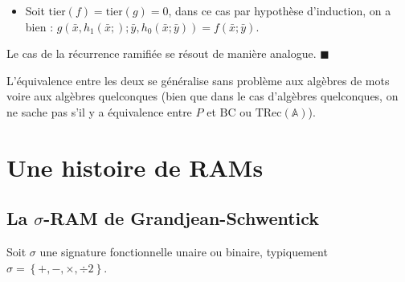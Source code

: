 \documentclass{article}
\newcommand{\TRec}[1]{\text{TRec}\left(\mathbb{#1}\right)}
\begin{document}
\begin{demo}
\begin{itemize}
				\item 	Soit $\text{tier}(f) = \text{tier}(g) = 0$, dans ce cas par hypothèse d'induction, on a bien : $g( \bar{x}, h_1(\bar{x};) ; \bar{y}, h_0(\bar{x}; \bar{y})) = f(\bar{x} ; \bar{y})$.
			\end{itemize}
			
			Le cas de la récurrence ramifiée se résout de manière analogue. $\blacksquare$
		\end{demo}
		

		L'équivalence entre les deux se généralise sans problème aux algèbres de mots voire aux algèbres quelconques (bien que dans le cas d'algèbres quelconques, on ne sache pas s'il y a équivalence entre $P$ et $\text{BC}$ ou $\TRec{A}$).
		
		








	\pagebreak
	
	\section{Une histoire de RAMs}
	

	
		\subsection{La $\sigma$-RAM de Grandjean-Schwentick}
		
		
		Soit $\sigma$ une signature fonctionnelle unaire ou binaire, typiquement $\sigma = \left\lbrace +, -, \times, \div 2\right\rbrace$.
		
\end{document}
